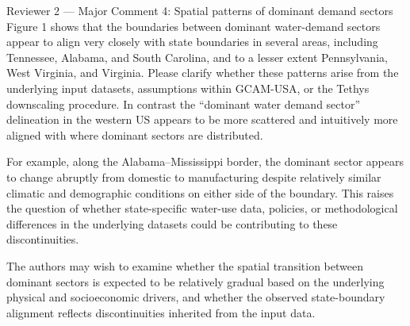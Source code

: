 \documentclass[11pt,letterpaper]{article}
\begin{document}
\begin{commentbox}[label={r2:maj4}]{Reviewer 2 --- Major Comment 4: Spatial patterns of dominant demand sectors}
Figure 1 shows that the boundaries between dominant water-demand sectors appear to align very closely with state boundaries in several areas, including Tennessee, Alabama, and South Carolina, and to a lesser extent Pennsylvania, West Virginia, and Virginia. Please clarify whether these patterns arise from the underlying input datasets, assumptions within GCAM-USA, or the Tethys downscaling procedure. In contrast the ``dominant water demand sector'' delineation in the western US appears to be more scattered and intuitively more aligned with where dominant sectors are distributed.

For example, along the Alabama--Mississippi border, the dominant sector appears to change abruptly from domestic to manufacturing despite relatively similar climatic and demographic conditions on either side of the boundary. This raises the question of whether state-specific water-use data, policies, or methodological differences in the underlying datasets could be contributing to these discontinuities.

The authors may wish to examine whether the spatial transition between dominant sectors is expected to be relatively gradual based on the underlying physical and socioeconomic drivers, and whether the observed state-boundary alignment reflects discontinuities inherited from the input data.
\end{commentbox}
\end{document}
